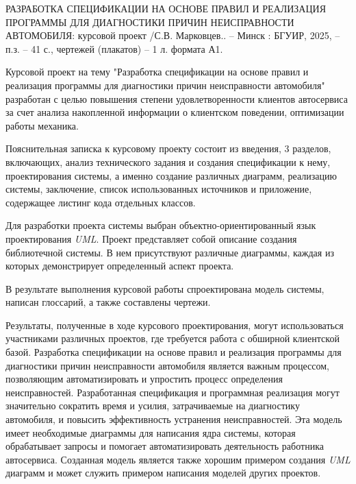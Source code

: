 
РАЗРАБОТКА СПЕЦИФИКАЦИИ НА ОСНОВЕ ПРАВИЛ И РЕАЛИЗАЦИЯ ПРОГРАММЫ ДЛЯ ДИАГНОСТИКИ ПРИЧИН НЕИСПРАВНОСТИ АВТОМОБИЛЯ: курсовой проект /С.В. Марковцев.. – Минск : БГУИР, 2025, – п.з. – 41 с., чертежей (плакатов) – 1 л. формата А1. 

Курсовой проект на тему "Разработка спецификации на основе правил и реализация программы для диагностики причин неисправности автомобиля" разработан с целью повышения степени удовлетворенности клиентов автосервиса за счет анализа накопленной информации о клиентском поведении, оптимизации работы механика.

Пояснительная записка к курсовому проекту состоит из введения, 3 разделов, включающих, анализ технического задания и создания спецификации к нему, проектирования системы, а именно создание различных диаграмм, реализацию системы, заключение, список использованных источников и приложение, содержащее листинг кода отдельных классов.

Для разработки проекта системы выбран объектно-ориентированный язык проектирования \textit{UML}. Проект представляет собой описание создания библиотечной системы. В нем присутствуют различные диаграммы, каждая из которых демонстрирует определенный аспект проекта.

В результате выполнения курсовой работы спроектирована модель системы, написан глоссарий, а также составлены чертежи. 

Результаты, полученные в ходе курсового проектирования, могут использоваться участниками различных проектов, где требуется работа с обширной клиентской базой. Разработка спецификации на основе правил и реализация программы для диагностики причин неисправности автомобиля является важным процессом, позволяющим автоматизировать и упростить процесс определения неисправностей. Разработанная спецификация и программная реализация могут значительно сократить время и усилия, затрачиваемые на диагностику автомобиля, и повысить эффективность устранения неисправностей. Эта модель имеет необходимые диаграммы для написания ядра системы, которая обрабатывает запросы и помогает автоматизировать деятельность работника автосервиса. Созданная модель является также хорошим примером создания \textit{UML} диаграмм и может служить примером написания моделей других проектов. 